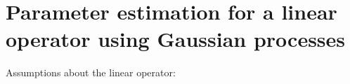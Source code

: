 \documentclass[letterpaper,10pt,english]{sphinxmanual}
\begin{document}
%
\begin{sphinxVerbatim}[commandchars=\\\{\}]
    
\end{sphinxVerbatim}

%
\begin{sphinxVerbatim}[commandchars=\\\{\}]
    
      
\end{sphinxVerbatim}

%
\begin{sphinxVerbatim}[commandchars=\\\{\}]
    
   
\end{sphinxVerbatim}

%
\begin{sphinxVerbatim}[commandchars=\\\{\}]
\end{sphinxVerbatim}

\noindent{}


\chapter{Parameter estimation for a linear operator using Gaussian processes}
\label{\detokenize{notebooks/par_est/par_est:parameter-estimation-for-a-linear-operator-using-gaussian-processes}}\label{\detokenize{notebooks/par_est/par_est::doc}}
Assumptions about the linear operator:
\end{document}
